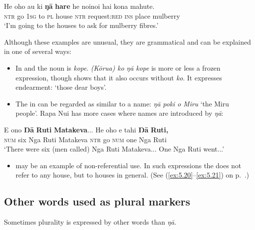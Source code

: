 \ea\label{ex:5.91}
\gll He oho au ki \textbf{ŋā} \textbf{hare} he no{\ꞌ}ino{\ꞌ}i hai kona mahute. \\
\textsc{ntr} go \textsc{1sg} to \textsc{pl} house \textsc{ntr} request:\textsc{red} \textsc{ins} place mulberry \\

\glt
‘I’m going to the houses to ask for mulberry fibres.’ \textstyleExampleref{[R352.025]} 
\z

Although these examples are unusual, they are grammatical and can be explained in one of several ways:

\begin{itemize}
\item 
In  and  the noun is \textit{kope}. \textit{(Kōrua) ko ŋā kope} is more or less a frozen expression, though  shows that it also occurs without \textit{ko}. It expresses endearment: ‘those dear boys’.

\item 
The  in  can be regarded as similar to a name: \textit{ŋā poki o Miru} ‘the Miru people’. Rapa Nui has more cases where names are introduced by \textit{ŋā}:

\end{itemize}

\ea\label{ex:5.92}
\gll E ono \textbf{Ŋā} \textbf{Ruti} \textbf{Matakeva}... He oho e tahi \textbf{Ŋā} \textbf{Ruti,} \\
\textsc{num} six Nga Ruti Matakeva \textsc{ntr} go \textsc{num} one Nga Ruti \\

\glt
‘There were six (men called) Nga Ruti Matakeva... One Nga Ruti went...’ \textstyleExampleref{[Mtx-3-11.001,005]}
\z

\begin{itemize}
\item 
	 may be an example of non-referential use. In such expressions the  does not refer to any house, but to houses in general. (See (\ref{ex:5.20}–\ref{ex:5.21}) on p.~\pageref{ex:5.20}.)
\end{itemize}
\subsection{Other words used as plural markers}\label{sec:5.5.3}

Sometimes plurality is expressed by other words than \textit{ŋā}. 

